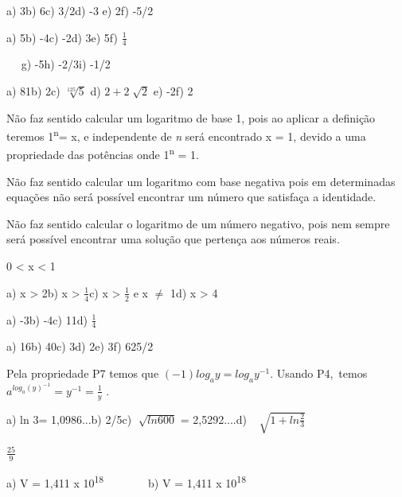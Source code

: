 \begin{respostas}{2}

    \ansitem{} a) 3\quad \quad b) 6\quad \quad c) 3/2\quad \quad d) -3 \quad \quad e) 2\quad \quad f) -5/2

    \ansitem{} a) 5\quad \quad b) -4\quad \quad c) -2\quad \quad d) 3\quad \quad e) 5\quad \quad f) $\frac{1}{4}$

~~ \quad g) -5\quad \quad h) -2/3\quad \quad i) -1/2

    \ansitem{} a) 81\quad \quad b) 2\quad \quad c)  \( \sqrt[125]{5} \) \quad d)  \( 2+2\sqrt[]{2} \) \quad e) -2\quad \quad f) 2

    \ansitem{} Não faz sentido calcular um logaritmo de base 1, pois ao aplicar a definição teremos 1\textsuperscript{n}= x, e independente de \textit{n} será encontrado x = 1, devido a uma propriedade das potências onde 1\textsuperscript{n }= 1.

    \ansitem{} Não faz sentido calcular um logaritmo com base negativa pois em determinadas equações não será possível encontrar um número que satisfaça a identidade.

    \ansitem{}Não faz sentido calcular o logaritmo de um número negativo, pois nem sempre será possível encontrar uma solução que pertença aos números reais.

    \ansitem{} 0 < x < 1

    \ansitem{} a) x > 2\quad b) x > $\frac{1}{4}$\quad c) x > $\frac{1}{2}$ e x $ \neq $  1\quad d) x > 4

\end{respostas}

\begin{respostas}{3}

    \ansitem{} a) -3\quad \quad b) -4\quad \quad c) 11\quad \quad d) $\frac{1}{4}$

    \ansitem{} a) 16\quad \quad b) 40\quad \quad c) 3\quad \quad d) 2\quad \quad e) 3\quad f) 625/2

    \ansitem{} Pela propriedade P7 temos que  \(  \left( -1 \right) log_{a}y=log_{a}y^{-1} \). Usando P4,~temos \( a^{log_{a} \left( y \right) ^{-1}}=y^{-1}=\frac{1}{y} \) .

    \ansitem{} a) ln 3\quad = 1,0986...\quad b) 2/5\quad \quad c)  \( \sqrt[]{ln600} \)  = 2,5292....\quad d)~  \( \sqrt[]{1+ln\frac{2}{3}} \) 

    \ansitem{}  \( \frac{25}{9} \)

    \ansitem{} a) V = 1,411 x 10\textsuperscript{18~~ }~~~~~ b) V = 1,411 x 10\textsuperscript{18}
\end{respostas}

